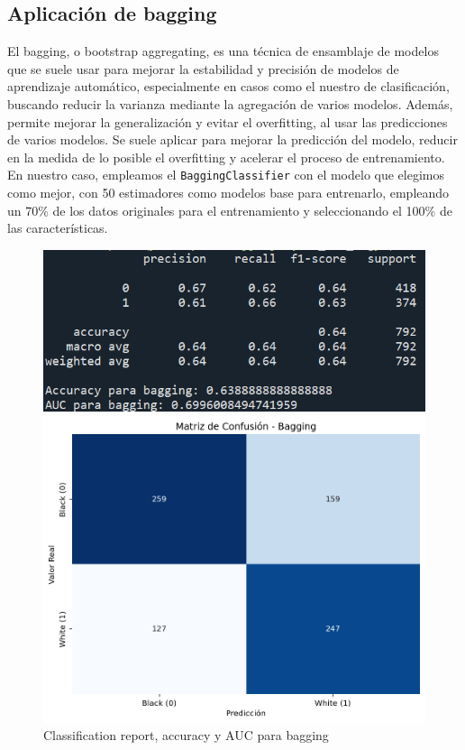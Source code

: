 \documentclass[a4paper,onecolumn]{extarticle}
\begin{document}
\begin{sloppypar}
\subsection{Aplicación de bagging}\label{bagging}
El bagging, o bootstrap aggregating, es una técnica de ensamblaje de modelos que se suele usar para mejorar la estabilidad y precisión de modelos de aprendizaje
automático, especialmente en casos como el nuestro de clasificación, buscando reducir la varianza mediante la agregación de varios modelos. Además, permite mejorar
la generalización y evitar el overfitting, al usar las predicciones de varios modelos. Se suele aplicar para mejorar la predicción del modelo, reducir en la 
medida de lo posible el overfitting y acelerar el proceso de entrenamiento. En nuestro caso, empleamos el \texttt{BaggingClassifier} con el modelo que elegimos 
como mejor, con 50 estimadores como modelos base para entrenarlo, empleando un 70\% de los datos originales para el entrenamiento y seleccionando el 100\% de 
las características.
\begin{figure}[h!]
    \centering
    \begin{minipage}[b]{0.45\textwidth}
        \centering
        \includegraphics[width=\textwidth]{imgs/reportBagging.png}
        \caption{Classification report, accuracy y AUC para bagging}
        \label{fig:baggingACC}
    \end{minipage}%
    \hspace{1em}  %
    \begin{minipage}[b]{0.45\textwidth}
        \centering
        \includegraphics[width=\textwidth]{imgs/confBagging.png}

\end{minipage}
\end{figure}
\end{sloppypar}
\end{document}
